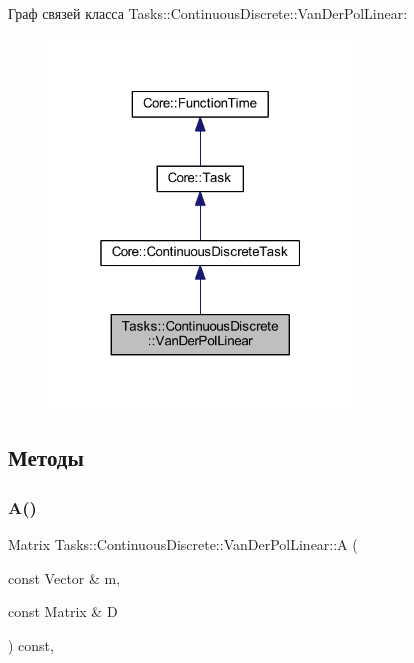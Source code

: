 Граф связей класса Tasks\+:\+:Continuous\+Discrete\+:\+:Van\+Der\+Pol\+Linear\+:
\nopagebreak
\begin{figure}[H]
\begin{center}
\leavevmode
\includegraphics[width=229pt]{class_tasks_1_1_continuous_discrete_1_1_van_der_pol_linear__coll__graph}
\end{center}
\end{figure}


\subsection{Методы}
\hypertarget{class_tasks_1_1_continuous_discrete_1_1_van_der_pol_linear_abc0ead5ddd90702a5bbb93b07c74df85}{}\label{class_tasks_1_1_continuous_discrete_1_1_van_der_pol_linear_abc0ead5ddd90702a5bbb93b07c74df85} 
\subsubsection{\texorpdfstring{A()}{A()}}
{\footnotesize\ttfamily Matrix Tasks\+::\+Continuous\+Discrete\+::\+Van\+Der\+Pol\+Linear\+::A (\begin{DoxyParamCaption}\item[{const Vector \&}]{m,  }\item[{const Matrix \&}]{D }\end{DoxyParamCaption}) const\hspace{0.3cm}{\ttfamily [override]}, {\ttfamily [virtual]}}



